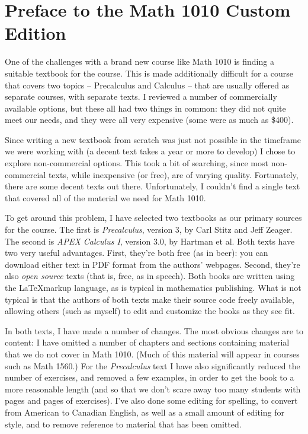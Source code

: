 \section*{Preface to the Math 1010 Custom Edition}

One of the challenges with a brand new course like Math 1010 is finding a suitable textbook for the course. This is made additionally difficult for a course that covers two topics -- Precalculus and Calculus -- that are usually offered as separate courses, with separate texts. I reviewed a number of commercially available options, but these all had two things in common: they did not quite meet our needs, and they were all very expensive (some were as much as \$400).

Since writing a new textbook from scratch was just not possible in the timeframe we were working with (a decent text takes a year or more to develop) I chose to explore non-commercial options. This took a bit of searching, since most non-commercial texts, while inexpensive (or free), are of varying quality. Fortunately, there are some decent texts out there. Unfortunately, I couldn't find a single text that covered all of the material we need for Math 1010.

To get around this problem, I have selected two textbooks as our primary sources for the course. The first is \textit{Precalculus}, version 3, by Carl Stitz and Jeff Zeager. The second is \textit{APEX Calculus I},  version 3.0, by Hartman et al. Both texts have two very useful advantages. First, they're both free (as in beer): you can download either text in PDF format from the authors' webpages. Second, they're also \textit{open source} texts (that is, free, as in speech). Both books are written using the \LaTeX markup language, as is typical in mathematics publishing. What is not typical is that the authors of both texts make their source code freely available, allowing others (such as myself) to edit and customize the books as they see fit.

In both texts, I have made a number of changes. The most obvious changes are to content: I have omitted a number of chapters and sections containing material that we do not cover in Math 1010. (Much of this material will appear in courses such as Math 1560.) For the \textit{Precalculus} text I have also significantly reduced the number of exercises, and removed a few examples, in order to get the book to a more reasonable length (and so that we don't scare away too many students with pages and pages of exercises). I've also done some editing for spelling, to convert from American to Canadian English, as well as a small amount of editing for style, and to remove reference to material that has been omitted.

